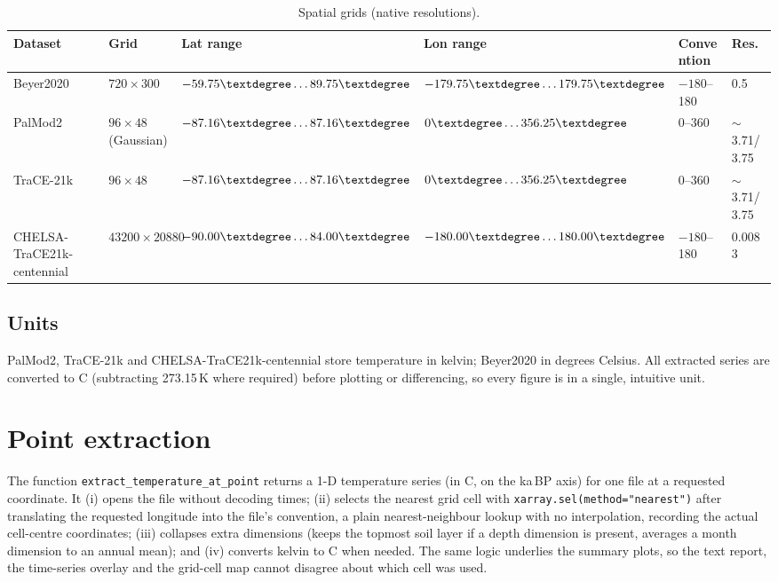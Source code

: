 \documentclass{isprs}
\newcommand{\dg}{\textdegree}
\newcommand{\degC}{\textdegree C}
\newcommand{\tabbr}[1]{\texttt{#1}}
\newcommand{\kaBP}{ka\,BP}
\begin{document}
\begin{table}[t]
\centering
\small
\begin{tabular}{llllll}
\toprule
Dataset   					& Grid                    & Lat range                   & Lon range                     & Convention  & Res. \\
\midrule
Beyer2020					& $720\times300$          & $-59.75\dg \ldots 89.75\dg$ & $-179.75\dg \ldots 179.75\dg$ & $-180$--180 & 0.5\dg \\
PalMod2						& $96\times48$ (Gaussian) & $-87.16\dg \ldots 87.16\dg$ & $0\dg \ldots 356.25\dg$       & 0--360      & $\sim$3.71/3.75\dg \\
TraCE-21k					& $96\times48$            & $-87.16\dg \ldots 87.16\dg$ & $0\dg \ldots 356.25\dg$       & 0--360      & $\sim$3.71/3.75\dg \\
CHELSA-TraCE21k-centennial	& $43200\times20880$      & $-90.00\dg \ldots 84.00\dg$ & $-180.00\dg \ldots 180.00\dg$ & $-180$--180 & 0.0083\dg \\
\bottomrule
\end{tabular}
\caption{Spatial grids (native resolutions).}
\label{tab:space}
\end{table}

\subsection{Units}
PalMod2, TraCE-21k and CHELSA-TraCE21k-centennial store temperature in kelvin; Beyer2020 in degrees Celsius. All extracted series are converted to \degC{} (subtracting 273.15\,K where required) before plotting or differencing, so every figure is in a single, intuitive unit.

\section{Point extraction}
\label{sec:extraction}
The function \tabbr{extract\_temperature\_at\_point} returns a 1-D temperature series (in \degC, on the \kaBP{} axis) for one file at a requested coordinate. It (i) opens the file without decoding times; (ii) selects the nearest grid cell with \tabbr{xarray.sel(method="nearest")} after translating the requested longitude into the file's convention, a plain nearest-neighbour lookup with no interpolation, recording the actual cell-centre coordinates; (iii) collapses extra dimensions (keeps the topmost soil layer if a depth dimension is present, averages a month dimension to an annual mean); and (iv) converts kelvin to \degC{} when needed. The same logic underlies the summary plots, so the text report, the time-series overlay and the grid-cell map cannot disagree about which cell was used.
\end{document}
